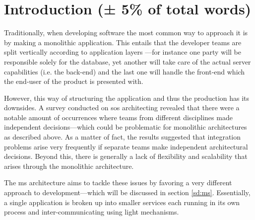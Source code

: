 \section{Introduction (± 5\% of total words)}

Traditionally, when developing software the most common way to
approach it is by making a monolithic application.
\cite{ms-challenges} This entails that the developer teams are split
vertically \cite{ms-challenges} according to application layers
\cite{ms-definition}---for instance one party will be responsible
solely for the database, yet another will take care of the actual
server capabilities (i.e. the back-end) and the last one will handle
the front-end which the end-user of the product is presented with.

However, this way of structuring the application and thus the
production has its downsides. A survey conducted on \gls{sos}
architecting \cite{sos-survey} revealed that there were a notable
amount of occurrences where teams from different disciplines made
independent decisions---which could be problematic for monolithic
architectures as described above. As a matter of fact, the results
suggested that integration problems arise very frequently if separate
teams make independent architectural decisions. \cite{sos-survey}
Beyond this, there is generally a lack of flexibility and scalability
that arises through the monolithic architecture. \cite{ms-challenges}

The \gls{ms} architecture aims to tackle these issues
\cite{ms-challenges} by favoring a very different approach to
development---which will be discussed in section \vref{sd:ms}.
Essentially, a single application is broken up into smaller services
each running in its own process and inter-communicating using light
mechanisms.  \cite{ms-arch-study}




